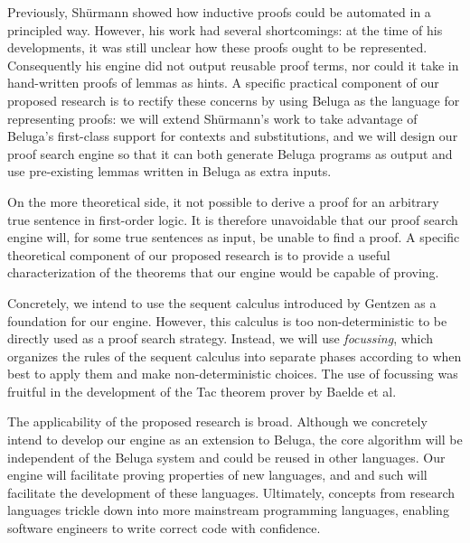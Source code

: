 \documentclass[12pt,letterpaper]{article}
\begin{document}
Previously, Shürmann\cite{shurmann-phd} showed how inductive proofs
could be automated in a principled way.
However, his work had several shortcomings: at the time of his developments, it
was still unclear how these proofs ought to be represented. Consequently his
engine did not output reusable proof terms, nor could it take in hand-written
proofs of lemmas as hints.
A specific practical component of our proposed research is to rectify
these concerns by using Beluga as the language for representing proofs: we will
extend Shürmann's work to take advantage of Beluga's first-class support for
contexts and substitutions, and we will design our proof search engine so that
it can both generate Beluga programs as output and use pre-existing lemmas
written in Beluga as extra inputs.

On the more theoretical side, it not possible to derive a proof
for an arbitrary true sentence in first-order logic.
It is therefore unavoidable that our proof search engine will, for some true
sentences as input, be unable to find a proof.
A specific theoretical component of our proposed research is to provide a
useful characterization of the theorems that our engine would be capable of
proving.

Concretely, we intend to use the sequent calculus introduced by Gentzen as a
foundation for our engine. However, this calculus is too non-deterministic to
be directly used as a proof search strategy. Instead, we will use
\emph{focussing}, which organizes the rules of the sequent calculus into
separate phases according to when best to apply them and make non-deterministic
choices. The use of focussing was fruitful in the development of the Tac
theorem prover\cite{tac} by Baelde et al.

The applicability of the proposed research is broad. Although we concretely
intend to develop our engine as an extension to Beluga, the core algorithm will
be independent of the Beluga system and could be reused in other languages.
Our engine will facilitate proving properties of new languages, and and such
will facilitate the development of these languages. Ultimately, concepts from
research languages trickle down into more mainstream programming languages,
enabling software engineers to write correct code with confidence.

\pagebreak
\printbibliography
\end{document}
